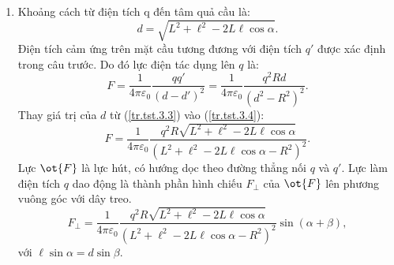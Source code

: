 \begin{loigiai}
\begin{enumerate}[1)]
\begin{center}
    \end{center}
    \item Khoảng cách từ điện tích q đến tâm quả cầu là:
    \[d=\sqrt{{{L}^{2}}+{{\ell }^{2}}-2L\ell \cos \alpha }. \tag{3} \label{tr.tst.3.3}\]
    Điện tích cảm ứng trên mặt cầu tương đương với điện tích $q'$ được xác định trong câu trước. Do đó lực điện tác dụng lên $q$ là: 	
    \[F=\dfrac{1}{4\pi {{\varepsilon }_{0}}}\dfrac{qq'}{{{\left( d-d' \right)}^{2}}}=\dfrac{1}{4\pi {{\varepsilon }_{0}}}\dfrac{{{q}^{2}}Rd}{{{\left( {{d}^{2}}-{{R}^{2}} \right)}^{2}}}. \tag{4} \label{tr.tst.3.4}\]
    Thay giá trị của $d$ từ (\ref{tr.tst.3.3}) vào (\ref{tr.tst.3.4}): 
    \[F=\dfrac{1}{4\pi {{\varepsilon }_{0}}}\dfrac{{{q}^{2}}R\sqrt{{{L}^{2}}+{{\ell }^{2}}-2L\ell \cos \alpha }}{{{\left( {{L}^{2}}+{{\ell }^{2}}-2L\ell \cos \alpha -{{R}^{2}} \right)}^{2}}}.\]
    Lực $\ot{F}$ là lực hút, có hướng dọc theo đường thẳng nối $q$ và $q'$. Lực làm điện tích $q$ dao động là thành phần hình chiếu ${{F}_{\bot }}$ của $\ot{F}$ lên phương vuông góc với dây treo.
	\[{{F}_{\bot }}=\dfrac{1}{4\pi {{\varepsilon }_{0}}}\dfrac{{{q}^{2}}R\sqrt{{{L}^{2}}+{{\ell }^{2}}-2L\ell \cos \alpha }}{{{\left( {{L}^{2}}+{{\ell }^{2}}-2L\ell \cos \alpha -{{R}^{2}} \right)}^{2}}}\sin \left( \alpha +\beta  \right),\]
	với $\ell \sin \alpha =d\sin \beta .$
    \begin{center}

\begin{tikzpicture}[x=0.75pt,y=0.75pt,yscale=-1,xscale=1]


\end{tikzpicture}
\end{center}
\end{enumerate}
\end{loigiai}
